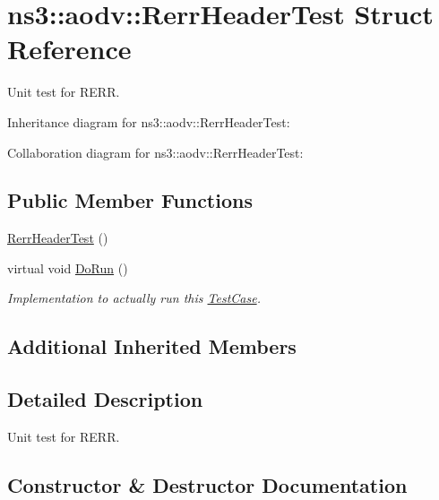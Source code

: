 \hypertarget{structns3_1_1aodv_1_1RerrHeaderTest}{}\section{ns3\+:\+:aodv\+:\+:Rerr\+Header\+Test Struct Reference}
\label{structns3_1_1aodv_1_1RerrHeaderTest}


Unit test for R\+E\+RR.  




Inheritance diagram for ns3\+:\+:aodv\+:\+:Rerr\+Header\+Test\+:


Collaboration diagram for ns3\+:\+:aodv\+:\+:Rerr\+Header\+Test\+:
\subsection*{Public Member Functions}
\begin{DoxyCompactItemize}
\item 
\hyperlink{structns3_1_1aodv_1_1RerrHeaderTest_ab311797a132e7c79d5d00611b722d98c}{Rerr\+Header\+Test} ()
\item 
virtual void \hyperlink{structns3_1_1aodv_1_1RerrHeaderTest_a7acc575689dac9ac653b254a7ff84272}{Do\+Run} ()
\begin{DoxyCompactList}\small\item\em Implementation to actually run this \hyperlink{classns3_1_1TestCase}{Test\+Case}. \end{DoxyCompactList}\end{DoxyCompactItemize}
\subsection*{Additional Inherited Members}


\subsection{Detailed Description}
Unit test for R\+E\+RR. 

\subsection{Constructor \& Destructor Documentation}
